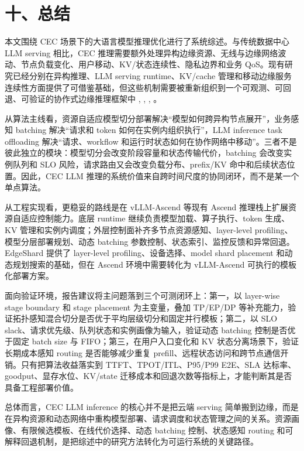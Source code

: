 \section*{十、总结}

本文围绕 CEC 场景下的大语言模型推理优化进行了系统综述。与传统数据中心 LLM serving 相比，CEC 推理需要额外处理异构边缘资源、无线与边缘网络波动、节点负载变化、用户移动、KV/状态连续性、隐私边界和业务 QoS。现有研究已经分别在异构推理、LLM serving runtime、KV/cache 管理和移动边缘服务连续性方面提供了可借鉴基础，但这些机制需要被重新组织到一个可观测、可回退、可验证的协作式边缘推理框架中 \cite{jiang2023hexgen,yu2022orca,kwon2023efficient,agrawal2024taming,zhong2024distserve}, \cite{duan2022distributed}, \cite{patel2024splitwise}, \cite{qin2025mooncake,liu2024cachegen,srivatsa2025preble,gao2024cost,ouyang2018follow,sheng2024fairness}。

从算法主线看，资源自适应模型切分部署解决“模型如何跨异构节点展开”，业务感知 batching 解决“请求和 token 如何在实例内组织执行”，LLM inference task offloading 解决“请求、workflow 和运行时状态如何在协作网络中移动”。三者不是彼此独立的模块：模型切分会改变阶段容量和状态传输代价，batching 会改变实例队列和 SLO 风险，请求路由又会改变负载分布、prefix/KV 命中和后续状态位置。因此，CEC LLM 推理的系统价值来自跨时间尺度的协同闭环，而不是某一个单点算法。

从工程实现看，更稳妥的路线是在 vLLM-Ascend 等现有 Ascend 推理栈上扩展资源自适应控制能力。底层 runtime 继续负责模型加载、算子执行、token 生成、KV 管理和实例内调度；外层控制面补齐多节点资源感知、layer-level profiling、模型分层部署规划、动态 batching 参数控制、状态索引、监控反馈和异常回退。EdgeShard 提供了 layer-level profiling、设备选择、model shard placement 和动态规划搜索的基础，但在 Ascend 环境中需要转化为 vLLM-Ascend 可执行的模板化部署方案。

面向验证环境，报告建议将主问题落到三个可测闭环上：第一，以 layer-wise stage boundary 和 stage placement 为主变量，叠加 TP/EP/DP 等补充能力，验证拓扑感知混合切分是否优于平均层级切分和固定并行模板；第二，以 SLO slack、请求优先级、队列状态和实例画像为输入，验证动态 batching 控制是否优于固定 batch size 与 FIFO；第三，在用户入口变化和 KV 状态分离场景下，验证长期成本感知 routing 是否能够减少重复 prefill、远程状态访问和跨节点通信开销。只有把算法收益落实到 TTFT、TPOT/ITL、P95/P99 E2E、SLA 达标率、goodput、显存水位、KV/state 迁移成本和回退次数等指标上，才能判断其是否具备工程部署价值。

总体而言，CEC LLM inference 的核心并不是把云端 serving 简单搬到边缘，而是在异构资源和动态网络中重构模型部署、请求调度和状态管理之间的关系。资源画像、有限候选模板、在线代价选择、动态 batching 控制、状态感知 routing 和可解释回退机制，是把综述中的研究方法转化为可运行系统的关键路径。
